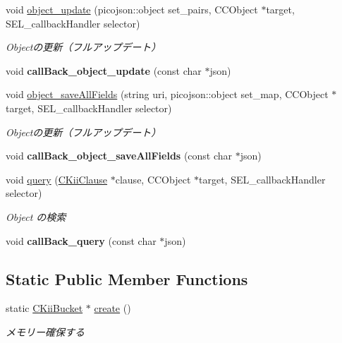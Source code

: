 \begin{DoxyCompactItemize}
\item 
void \hyperlink{class_c_kii_bucket_acb04ad4f7f9f0e955975f4442237d441}{object\-\_\-update} (picojson\-::object set\-\_\-pairs, C\-C\-Object $\ast$target, S\-E\-L\-\_\-callback\-Handler selector)
\begin{DoxyCompactList}\small\item\em Objectの更新（フルアップデート） \end{DoxyCompactList}\item 
\hypertarget{class_c_kii_bucket_aca9a0b2e3caf7495711312828632bd8e}{void {\bfseries call\-Back\-\_\-object\-\_\-update} (const char $\ast$json)}\label{class_c_kii_bucket_aca9a0b2e3caf7495711312828632bd8e}

\item 
void \hyperlink{class_c_kii_bucket_ac41f5c221ef100fd85190b4ec52b027d}{object\-\_\-save\-All\-Fields} (string uri, picojson\-::object set\-\_\-map, C\-C\-Object $\ast$target, S\-E\-L\-\_\-callback\-Handler selector)
\begin{DoxyCompactList}\small\item\em Objectの更新（フルアップデート） \end{DoxyCompactList}\item 
\hypertarget{class_c_kii_bucket_a0da084bd40c26d964169e84804a18984}{void {\bfseries call\-Back\-\_\-object\-\_\-save\-All\-Fields} (const char $\ast$json)}\label{class_c_kii_bucket_a0da084bd40c26d964169e84804a18984}

\item 
void \hyperlink{class_c_kii_bucket_aaa0404dee706f1330fd4d1261dbdf3f3}{query} (\hyperlink{class_c_kii_clause}{C\-Kii\-Clause} $\ast$clause, C\-C\-Object $\ast$target, S\-E\-L\-\_\-callback\-Handler selector)
\begin{DoxyCompactList}\small\item\em Object の検索 \end{DoxyCompactList}\item 
\hypertarget{class_c_kii_bucket_aa36a27887af9177dc7809da7b723bb47}{void {\bfseries call\-Back\-\_\-query} (const char $\ast$json)}\label{class_c_kii_bucket_aa36a27887af9177dc7809da7b723bb47}

\end{DoxyCompactItemize}
\subsection*{Static Public Member Functions}
\begin{DoxyCompactItemize}
\item 
static \hyperlink{class_c_kii_bucket}{C\-Kii\-Bucket} $\ast$ \hyperlink{class_c_kii_bucket_a282979b68d7540433bfb24a4624702de}{create} ()
\begin{DoxyCompactList}\small\item\em メモリー確保する \end{DoxyCompactList}\end{DoxyCompactItemize}
